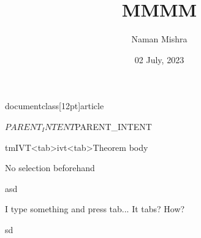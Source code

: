 documentclass[12pt]{article}


\title{MMMM}
\author{Naman Mishra}
\date{02 July, 2023}


\maketitle




\begin{}
    \begin{}
$PARENT_INTENT      
$PARENT_INTENT  \end{}
\end{}
tmIVT<tab>ivt<tab>Theorem body

\begin{interesting}
    \begin{}
       
    \end{}
\end{interesting}
\begin{meow}
    No selection beforehand
\end{meow}
\begin{}
    asd
\end{}
\begin{empty}
    I type something and press tab...   It tabs?
    How?
\end{empty}
\begin{meow}
    \begin{empty}
        
    \end{empty}
\end{meow}
\begin{}
    \begin{meow}
            sd
    \end{meow}
\end{}

